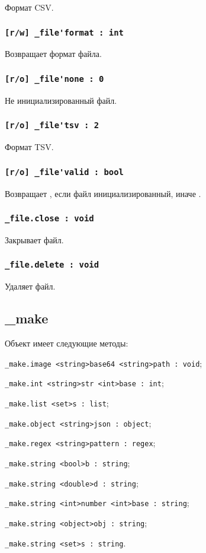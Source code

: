 Формат CSV.

\subsubsection{\lstinline|[r/w] _file'format : int|}

Возвращает формат файла.

\subsubsection{\lstinline|[r/o] _file'none : 0|}

Не инициализированный файл.

\subsubsection{\lstinline|[r/o] _file'tsv : 2|}

Формат TSV.

\subsubsection{\lstinline|[r/o] _file'valid : bool|}

Возвращает \true, если файл инициализированный, иначе \false.

\subsubsection{\lstinline|_file.close : void|}

Закрывает файл.

\subsubsection{\lstinline|_file.delete : void|}

Удаляет файл.

\subsection{{\color{orange} \_make}}

Объект \make{} имеет следующие методы:
\begin{icItems}
	\item \lstinline|_make.image <string>base64 <string>path : void|;
	\item \lstinline|_make.int <string>str <int>base : int|;
	\item \lstinline|_make.list <set>s : list|;
	\item \lstinline|_make.object <string>json : object|;
	\item \lstinline|_make.regex <string>pattern : regex|;
	\item \lstinline|_make.string <bool>b : string|;
	\item \lstinline|_make.string <double>d : string|;
	\item \lstinline|_make.string <int>number <int>base : string|;
	\item \lstinline|_make.string <object>obj : string|;
	\item \lstinline|_make.string <set>s : string|.
\end{icItems}

